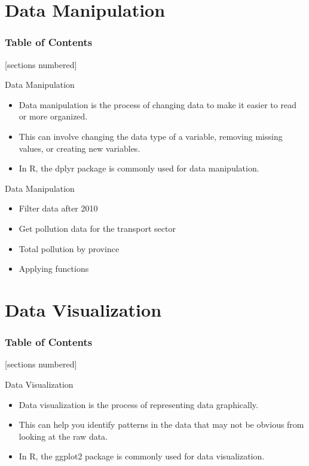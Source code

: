 \documentclass[serif, 9pt, aspectratio=32]{beamer}
\begin{document}
\section{Data Manipulation}

\begin{frame}
    \frametitle{Table of Contents}
    [sections numbered]
    \tableofcontents[currentsection]
\end{frame}

\begin{frame}{Data Manipulation}
    \begin{itemize}
        \setlength{\itemsep}{3em}
        \item Data manipulation is the process of changing data to make it easier to read or more organized.
        \item This can involve changing the data type of a variable, removing missing values, or creating new variables.
        \item In R, the dplyr package is commonly used for data manipulation.
    \end{itemize}
\end{frame}

\begin{frame}{Data Manipulation}
    \begin{itemize}
        \setlength{\itemsep}{3em}
        \item Filter data after 2010
        \item Get pollution data for the transport sector
        \item Total pollution by province
        \item Applying functions
    \end{itemize}
\end{frame}

\section{Data Visualization}

\begin{frame}
    \frametitle{Table of Contents}
    [sections numbered]
    \tableofcontents[currentsection]
\end{frame}

\begin{frame}{Data Visualization}
    \begin{itemize}
        \setlength{\itemsep}{3em}
        \item Data visualization is the process of representing data graphically.
        \item This can help you identify patterns in the data that may not be obvious from looking at the raw data.
        \item In R, the ggplot2 package is commonly used for data visualization.
    \end{itemize}
\end{frame}
\end{document}
